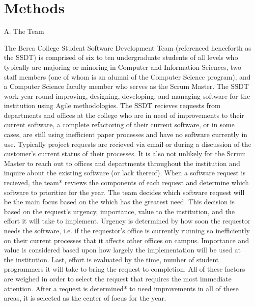 \section{Methods}
A.   The Team

The Berea College Student Software Development Team (referenced henceforth as the SSDT) is comprised of six to ten undergraduate students of all levels who typically are majoring or minoring in Computer and Information Sciences, two staff members (one of whom is an alumni of the Computer Science program), and a Computer Science faculty member who serves as the Scrum Master. The SSDT work year-round improving, designing, developing, and managing software for the institution using Agile methodologies. The SSDT recieves requests from departments and offices at the college who are in need of improvements to their current software, a complete refactoring of their current software, or in some cases, are still using inefficient paper processes and have no software currently in use. Typically project requests are recieved via email or during a discussion of the customer's current status of their processes. It is also not unlikely for the Scrum Master to reach out to offices and departments throughout the institution and inquire about the existing software (or lack thereof).  When a software request is recieved, the team* reviews the components of each request and determine which software to prioritize for the year. The team decides which software request will be the main focus based on the which has the greatest need. This decision is based on the request's urgency, importance, value to the institution, and the effort it will take to implement. Urgency is determined by how soon the requestor needs the software, i.e. if the requestor's office is currently running so inefficiently on their current processes that it affects other offices on campus. Importance and value is considered based upon how largely the implementation will be used at the institution. Last, effort is evaluated by the time, number of student programmers it will take to bring the request to completion. All of these factors are weighed in order to select the request that requires the most immediate attention. After a request is determined* to need improvements in all of these areas, it is selected as the center of focus for the year. 



